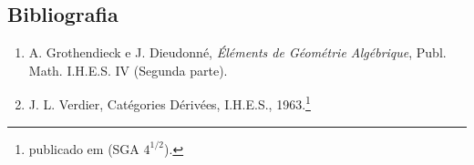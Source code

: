 \subsection*{Bibliografia}

\begin{enumerate}
\item[{[1]}] A. Grothendieck e J. Dieudonné, \emph{Éléments de Géométrie Algébrique}, Publ. Math. I.H.E.S. IV (Segunda parte).
\item[{[2]}] J. L. Verdier, Catégories Dérivées, I.H.E.S., 1963.\footnote{publicado em (SGA $4^{1/2}$).}
\end{enumerate}
